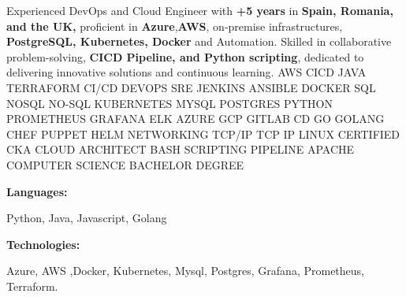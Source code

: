 \documentclass[9pt]{developercv} %
\begin{document}
\begin{minipage}[t]{0.46\textwidth}
    \vspace{-6pt}

    {Experienced DevOps and Cloud Engineer with \textbf{+5 years} in \textbf{Spain,
            Romania, and the UK,} proficient in \textbf{Azure},\textbf{AWS}, on-premise
        infrastructures, \textbf{PostgreSQL, Kubernetes, Docker} and Automation.
        Skilled in collaborative problem-solving, \textbf{CICD
            Pipeline, and Python scripting}, dedicated to delivering
        innovative solutions and continuous learning.}
    {\color{white}\tiny AWS CICD JAVA TERRAFORM CI/CD DEVOPS SRE JENKINS ANSIBLE DOCKER SQL NOSQL NO-SQL KUBERNETES MYSQL POSTGRES PYTHON PROMETHEUS GRAFANA ELK AZURE GCP GITLAB CD GO GOLANG CHEF PUPPET HELM NETWORKING TCP/IP TCP IP LINUX CERTIFIED CKA CLOUD ARCHITECT BASH SCRIPTING PIPELINE APACHE COMPUTER SCIENCE BACHELOR DEGREE  }
\end{minipage}
\hfill %
\begin{minipage}[t]{0.465\textwidth}
    \vspace{-6pt}

    \begin{minipage}[t]{0.2\textwidth}
        \textbf{Languages:}
    \end{minipage}
    \hfill
    \begin{minipage}[t]{0.72\textwidth}
        Python, Java, Javascript, Golang
    \end{minipage}
    \vspace{4mm}

    \begin{minipage}[t]{0.2\textwidth}
        \textbf{Technologies:}
    \end{minipage}
    \hfill
    \begin{minipage}[t]{0.73\textwidth}
        Azure, AWS ,Docker, Kubernetes, Mysql, Postgres, Grafana, Prometheus, Terraform.
    \end{minipage}

\end{minipage}
\end{document}
